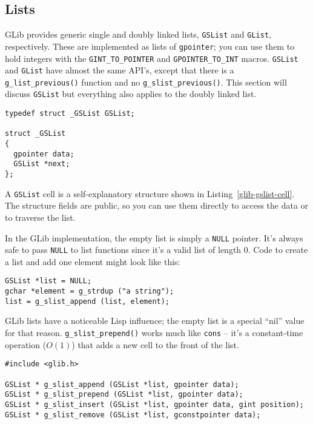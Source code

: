 \subsection{Lists}

GLib provides generic single and doubly linked lists, \lstinline{GSList} and \lstinline{GList}, respectively. These are implemented as lists of \lstinline{gpointer}; you can use them to hold integers with the \lstinline{GINT_TO_POINTER} and \lstinline{GPOINTER_TO_INT} macros. \lstinline{GSList} and \lstinline{GList} have almost the same API's, except that there is a \lstinline{g_list_previous()} function and no \lstinline{g_slist_previous()}. This section will discuss \lstinline{GSList} but everything also applies to the doubly linked list.

\begin{lstlisting}[float, caption={\lstinline{GSList} cell}, label=glib-gslist-cell]
typedef struct _GSList GSList;

struct _GSList
{
  gpointer data;
  GSList *next;
};
\end{lstlisting}

A \lstinline{GSList} cell is a self-explanatory structure shown in Listing~\ref{glib-gslist-cell}. The structure fields are public, so you can use them directly to access the data or to traverse the list.

In the GLib implementation, the empty list is simply a \lstinline{NULL} pointer. It's always safe to pass \lstinline{NULL} to list functions since it's a valid list of length 0. Code to create a list and add one element might look like this:
\begin{lstlisting}
GSList *list = NULL;
gchar *element = g_strdup ("a string");
list = g_slist_append (list, element);
\end{lstlisting}

GLib lists have a noticeable Lisp influence; the empty list is a special ``nil'' value for that reason. \lstinline{g_slist_prepend()} works much like \texttt{cons} -- it's a constant-time operation ($O(1)$) that adds a new cell to the front of the list.

\begin{lstlisting}[float, caption={Changing linked list contents}, label=glib-listchanging]
#include <glib.h>

GSList * g_slist_append (GSList *list, gpointer data);
GSList * g_slist_prepend (GSList *list, gpointer data);
GSList * g_slist_insert (GSList *list, gpointer data, gint position);
GSList * g_slist_remove (GSList *list, gconstpointer data);
\end{lstlisting}

